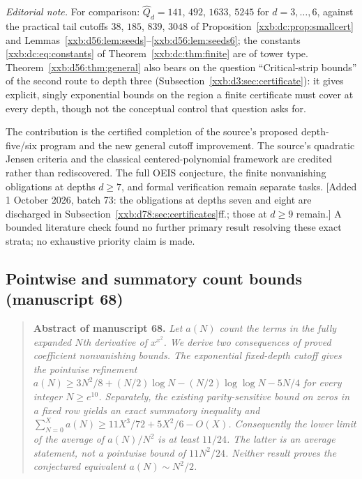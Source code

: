 \documentclass[11pt,a4paper]{article}
\numberwithin{equation}{section}
\theoremstyle{definition}
\theoremstyle{remark}
\theoremstyle{plain}
\begin{document}
\emph{Editorial note.}  For comparison: $\widehat Q_d=141$, $492$, $1633$,
$5245$ for $d=3,\ldots,6$, against the practical tail cutoffs $38$, $185$,
$839$, $3048$ of Proposition~\ref{xxb:dc:prop:smallcert} and
Lemmas~\ref{xxb:d56:lem:seeds}--\ref{xxb:d56:lem:seeds6}; the constants
\eqref{xxb:dc:eq:constants} of Theorem~\ref{xxb:dc:thm:finite} are of
tower type.  Theorem~\ref{xxb:d56:thm:general} also bears on the question
``Critical-strip bounds'' of the second route to depth three
(Subsection~\ref{xxb:d3:sec:certificate}): it gives explicit, singly
exponential bounds on the region a finite certificate must cover at every
depth, though not the conceptual control that question asks for.

The contribution is the certified completion of the source's proposed
depth-five/six program and the new general cutoff improvement. The source's
quadratic Jensen criteria and the classical centered-polynomial framework are
credited rather than rediscovered. The full OEIS conjecture, the finite
nonvanishing obligations at depths $d\ge7$, and formal verification remain
separate tasks.  [Added 1 October 2026, batch 73: the obligations at depths seven and eight are
discharged in Subsection~\ref{xxb:d78:sec:certificates}ff.; those at $d\ge9$
remain.] A bounded literature check found no further primary result
resolving these exact strata; no exhaustive priority claim is made.

\subsection{Pointwise and summatory count bounds (manuscript 68)}\label{xxb:cb:sec}

\begin{quote}\small
\textbf{Abstract of manuscript 68.}\itshape
Let $a(N)$ count the terms in the fully expanded $N$th derivative of
$x^{x^2}$. We derive two consequences of proved coefficient nonvanishing
bounds. The exponential fixed-depth cutoff gives the pointwise refinement
$a(N)\ge3N^2/8+(N/2)\log N-(N/2)\log\log N-5N/4$ for every integer
$N\ge e^{10}$. Separately, the existing parity-sensitive bound on zeros in a
fixed row yields an exact summatory inequality and
$\sum_{N=0}^X a(N)\ge11X^3/72+5X^2/6-O(X)$.
Consequently the lower limit of the average of $a(N)/N^2$ is at least
$11/24$. The latter is an average statement, not a pointwise bound of
$11N^2/24$. Neither result proves the conjectured equivalent
$a(N)\sim N^2/2$.
\upshape
\end{quote}
\end{document}
